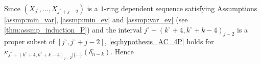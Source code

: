 \documentclass[aos]{imsart}
\begin{document}
\begin{appendix}
Since $(X_{j^\circ}, \dots, X_{j^\circ+j-2})$ is a $1$-ring dependent sequence satisfying Assumptions \eqref{assmp:min_var}, \eqref{assmp:min_ev} and \eqref{assmp:var_ev} (see \cref{thm:assmp_induction_P}) and the interval $j^\circ+(k^\circ+4, k^\circ+k-4)_{j-2}$ is a proper subset of $[j^\circ, j^\circ+j-2]$, \eqref{eq:hypothesis_AC_4P} holds for $\kappa_{j^\circ + (k^\circ+4,k^\circ+k-4)_{j-2}|\{\cdots\}}(\delta_{n-k}^\circ)$.
Hence

\end{appendix}
\end{document}
